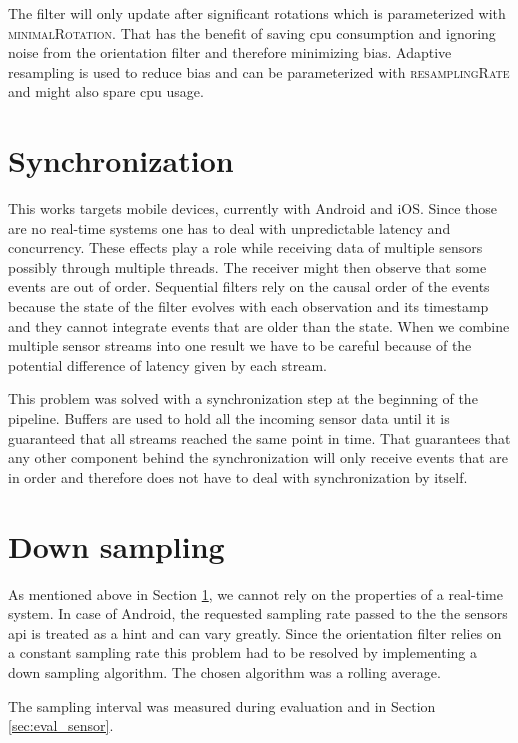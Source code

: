 The filter will only update after significant rotations which is parameterized with \textsc{minimalRotation}. That has the benefit of saving \gls{cpu} consumption and ignoring noise from the orientation filter and therefore minimizing bias. Adaptive resampling is used to reduce bias and can be parameterized with \textsc{resamplingRate} and might also spare \gls{cpu} usage.

\section{Synchronization}
\label{sec:impl_synchro}

This works targets mobile devices, currently with Android and iOS. Since those are no real-time systems one has to deal with unpredictable latency and concurrency. These effects play a role while receiving data of multiple sensors possibly through multiple threads. The receiver might then observe that some events are out of order. Sequential filters rely on the causal order of the events because the state of the filter evolves with each observation and its timestamp and they cannot integrate events that are older than the state. When we combine multiple sensor streams into one result we have to be careful because of the potential difference of latency given by each stream.

This problem was solved with a synchronization step at the beginning of the pipeline. Buffers are used to hold all the incoming sensor data until it is guaranteed that all streams reached the same point in time. That guarantees that any other component behind the synchronization will only receive events that are in order and therefore does not have to deal with synchronization by itself.

\section{Down sampling}
\label{sec:impl_downsample}

As mentioned above in Section \ref{sec:impl_synchro}, we cannot rely on the properties of a real-time system. In case of Android, the requested sampling rate passed to the the sensors \gls{api} is treated as a hint and can vary greatly. Since the orientation filter relies on a constant sampling rate this problem had to be resolved by implementing a down sampling algorithm. The chosen algorithm was a rolling average.

The sampling interval was measured during evaluation and in Section \ref{sec:eval_sensor}.

